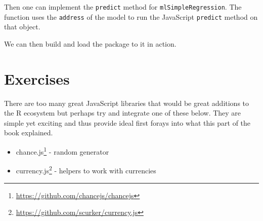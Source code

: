 \documentclass[10pt,]{krantz}
\makeatletter
\newenvironment{Shaded}{\begin{snugshade}}{\end{snugshade}}
\newcommand{\CommentTok}[1]{\textcolor[rgb]{0.37,0.37,0.37}{\textit{#1}}}
\newcommand{\ControlFlowTok}[1]{\textcolor[rgb]{0.27,0.27,0.27}{\textbf{#1}}}
\newcommand{\DecValTok}[1]{\textcolor[rgb]{0.06,0.06,0.06}{#1}}
\newcommand{\KeywordTok}[1]{\textcolor[rgb]{0.27,0.27,0.27}{\textbf{#1}}}
\newcommand{\NormalTok}[1]{#1}
\newcommand{\OperatorTok}[1]{\textcolor[rgb]{0.43,0.43,0.43}{\textbf{#1}}}
\newcommand{\StringTok}[1]{\textcolor[rgb]{0.5,0.5,0.5}{#1}}
\providecommand{\tightlist}{%
  \setlength{\itemsep}{0pt}\setlength{\parskip}{0pt}}
\renewcommand{\href}[2]{#2\footnote{\url{#1}}}
\newenvironment{kframe}{%
\medskip{}
\setlength{\fboxsep}{.8em}
 \def\at@end@of@kframe{}%
 \ifinner\ifhmode%
  \def\at@end@of@kframe{\end{minipage}}%
  \begin{minipage}{\columnwidth}%
 \fi\fi%
 \def\FrameCommand##1{\hskip\@totalleftmargin \hskip-\fboxsep
 \colorbox{shadecolor}{##1}\hskip-\fboxsep
     \hskip-\linewidth \hskip-\@totalleftmargin \hskip\columnwidth}%
 \MakeFramed {\advance\hsize-\width
   \@totalleftmargin\z@ \linewidth\hsize
   \@setminipage}}%
 {\par\unskip\endMakeFramed%
 \at@end@of@kframe}
\renewenvironment{Shaded}{\begin{kframe}}{\end{kframe}}
\makeatother
\begin{document}
Then one can implement the \texttt{predict} method for \texttt{mlSimpleRegression}. The function uses the \texttt{address} of the model to run the JavaScript \texttt{predict} method on that object.

\begin{Shaded}
\end{Shaded}

We can then build and load the package to it in action.

\begin{Shaded}
\end{Shaded}

\hypertarget{v8-ml-exercises}{%
\section{Exercises}\label{v8-ml-exercises}}

There are too many great JavaScript libraries that would be great additions to the R ecosystem but perhaps try and integrate one of these below. They are simple yet exciting and thus provide ideal first forays into what this part of the book explained.

\begin{itemize}
\tightlist
\item
  \href{https://github.com/chancejs/chancejs}{chance.js} - random generator
\item
  \href{https://github.com/scurker/currency.js}{currency.js} - helpers to work with currencies
\end{itemize}
\end{document}
